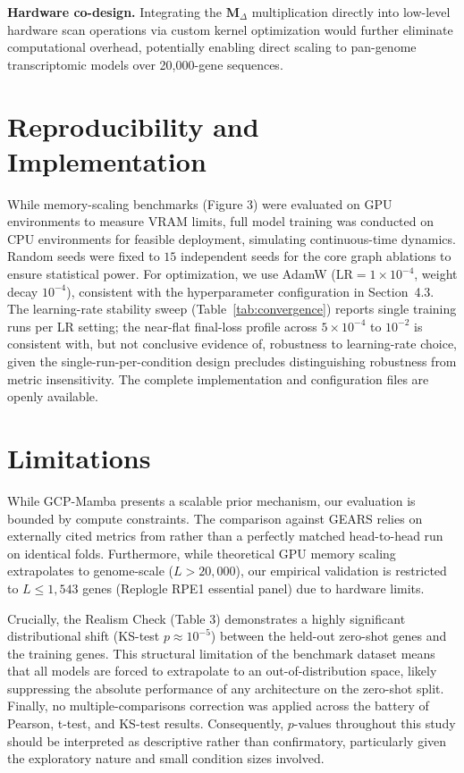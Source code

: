 \documentclass{bioinfo}
\begin{document}
\textbf{Hardware co-design.} Integrating the $\mathbf{M}_\Delta$ multiplication directly into low-level hardware scan operations via custom kernel optimization would further eliminate computational overhead, potentially enabling direct scaling to pan-genome transcriptomic models over 20,000-gene sequences.

\section{Reproducibility and Implementation}
While memory-scaling benchmarks (Figure 3) were evaluated on GPU environments to measure VRAM limits, full model training was conducted on CPU environments for feasible deployment, simulating continuous-time dynamics. Random seeds were fixed to $15$ independent seeds for the core graph ablations to ensure statistical power. For optimization, we use AdamW ($\text{LR}=1\times10^{-4}$, weight decay $10^{-4}$), consistent with the hyperparameter configuration in Section~4.3. The learning-rate stability sweep (Table~\ref{tab:convergence}) reports single training runs per LR setting; the near-flat final-loss profile across $5\times10^{-4}$ to $10^{-2}$ is consistent with, but not conclusive evidence of, robustness to learning-rate choice, given the single-run-per-condition design precludes distinguishing robustness from metric insensitivity. The complete implementation and configuration files are openly available.

\section{Limitations}
While GCP-Mamba presents a scalable prior mechanism, our evaluation is bounded by compute constraints. The comparison against GEARS relies on externally cited metrics from \cite{roohani2024} rather than a perfectly matched head-to-head run on identical folds. Furthermore, while theoretical GPU memory scaling extrapolates to genome-scale ($L>20,000$), our empirical validation is restricted to $L \le 1,543$ genes (Replogle RPE1 essential panel) due to hardware limits. 

Crucially, the Realism Check (Table 3) demonstrates a highly significant distributional shift (KS-test $p \approx 10^{-5}$) between the held-out zero-shot genes and the training genes. This structural limitation of the benchmark dataset means that all models are forced to extrapolate to an out-of-distribution space, likely suppressing the absolute performance of any architecture on the zero-shot split. Finally, no multiple-comparisons correction was applied across the battery of Pearson, t-test, and KS-test results. Consequently, $p$-values throughout this study should be interpreted as descriptive rather than confirmatory, particularly given the exploratory nature and small condition sizes involved.
\end{document}
